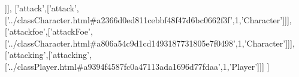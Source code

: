 \begin{DoxyCode}
  [\textcolor{stringliteral}{'armor'},[\textcolor{stringliteral}{'Armor'},[\textcolor{stringliteral}{'../classArmor.html#a23323e95bbeb488eb6fe54cbd83d49a2'},1,\textcolor{stringliteral}{'Armor'}]]],
  [\textcolor{stringliteral}{'attack'},[\textcolor{stringliteral}{'attack'},[\textcolor{stringliteral}{'../classCharacter.html#a2366d0ed811cebbf48f47d6bc0662f3f'},1,\textcolor{stringliteral}{'Character'}]]],
  [\textcolor{stringliteral}{'attackfoe'},[\textcolor{stringliteral}{'attackFoe'},[\textcolor{stringliteral}{'../classCharacter.html#a806a54c9d1cd1493187731805e7f0498'},1,\textcolor{stringliteral}{'Character'}]]],
  [\textcolor{stringliteral}{'attacking'},[\textcolor{stringliteral}{'attacking'},[\textcolor{stringliteral}{'../classPlayer.html#a9394f4587fc0a47113ada1696d77fdaa'},1,\textcolor{stringliteral}{'Player'}]]]
]
\end{DoxyCode}
